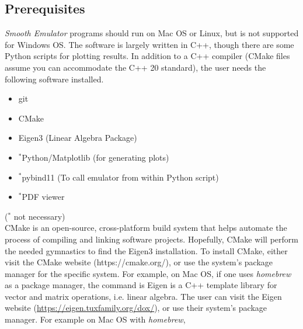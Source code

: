 \documentclass[UserManual.tex]{subfiles}
\begin{document}
\subsection{Prerequisites}
{\it Smooth Emulator} programs should run on Mac OS or Linux, but is not supported for Windows OS. The software is largely  written in C++, though there are some Python scripts for plotting results. In addition to a C++ compiler (CMake files assume you can accommodate the  C++ 20 standard), the user needs the following software installed.
\begin{itemize}\itemsep=0pt
    \item git
    \item CMake
    \item Eigen3 (Linear Algebra Package)
    \item $^*$Python/Matplotlib (for generating plots)
    \item $^*$pybind11 (To call emulator from within Python script)
    \item $^*$PDF viewer
\end{itemize}
\vspace*{-15pt}
($^*$ not necessary)\\
CMake is an open-source, cross-platform build system that helps automate the process of compiling and linking software projects. Hopefully, CMake will perform the needed gymnastics to find the Eigen3 installation. To install CMake, either visit the CMake website (https://cmake.org/), or use the system's package manager for the specific system. For example, on Mac OS, if one uses {\it homebrew} as a package manager, the command is
\vspace*{-8pt}{\tt
\begin{Verbatim}[commandchars=\\\{\}]
% \textcolor{darkred}{brew install cmake}
\end{Verbatim}
}\vspace*{-8pt}
Eigen is a C++ template library for vector and matrix operations, i.e. linear algebra. The user can visit the Eigen website (\url{https://eigen.tuxfamily.org/dox/}), or use their system's package manager. For example on Mac OS with {\it homebrew},
\vspace*{-8pt}{\tt
\begin{Verbatim}[commandchars=\\\{\}]
% \textcolor{darkred}{brew install eigen}
\end{Verbatim}
}\vspace*{-8pt}
\end{document}
